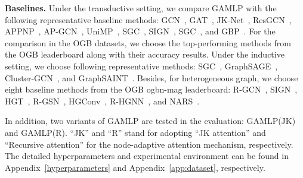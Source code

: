 \documentclass[sigconf]{acmart}
\begin{document}
\noindent\textbf{Baselines.} 
Under the transductive setting, we compare GAMLP with the following representative baseline methods: GCN~\citep{kipf2016semi}, GAT~\citep{velivckovic2017graph}, JK-Net~\citep{xu2018representation}, ResGCN~\citep{li2019deepgcns}, APPNP~\citep{DBLP:conf/iclr/KlicperaBG19}, AP-GCN~\citep{spinelli2020adaptive}, UniMP~\citep{shi2020masked}, SGC~\citep{wu2019simplifying}, SIGN~\citep{frasca2020sign}, SGC~\citep{zhu2021simple}, and GBP~\citep{DBLP:conf/nips/ChenWDL00W20}.
For the comparison in the OGB datasets, we choose the top-performing methods from the OGB leaderboard along with their accuracy results.
Under the inductive setting, we choose following representative methods: SGC~\citep{wu2019simplifying}, GraphSAGE~\citep{hamilton2017inductive}, Cluster-GCN~\citep{chiang2019cluster}, and GraphSAINT~\citep{DBLP:conf/iclr/ZengZSKP20}. 
Besides, for heterogeneous graph, we choose eight baseline methods from the OGB ogbn-mag leaderboard: R-GCN~\citep{schlichtkrull2018modeling}, SIGN~\citep{frasca2020sign}, HGT~\citep{hu2020heterogeneous}, R-GSN~\citep{wu2021r}, HGConv~\citep{yu2020hybrid}, R-HGNN~\citep{yu2021heterogeneous}, and NARS~\citep{yu2020scalable}. 

In addition, two variants of GAMLP are tested in the evaluation: GAMLP(JK) and GAMLP(R).
``JK'' and ``R'' stand for adopting ``JK attention'' and ``Recursive attention'' for the node-adaptive attention mechanism, respectively.
The detailed hyperparameters and experimental environment can be found in Appendix~\ref{hyperparameters} and Appendix~\ref{app:dataset}, respectively. 
\end{document}
